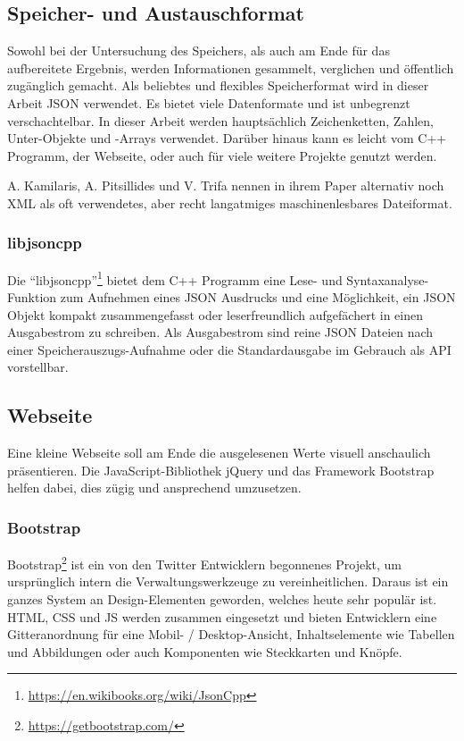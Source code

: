 \subsection{Speicher- und Austauschformat}
Sowohl bei der Untersuchung des Speichers, als auch am Ende für das aufbereitete Ergebnis, werden Informationen gesammelt, verglichen und öffentlich zugänglich gemacht.
Als beliebtes und flexibles Speicherformat wird in dieser Arbeit \ac{JSON} verwendet.
Es bietet viele Datenformate und ist unbegrenzt verschachtelbar.
In dieser Arbeit werden hauptsächlich Zeichenketten, Zahlen, Unter-Objekte und -Arrays verwendet.
Darüber hinaus kann es leicht vom C++ Programm, der Webseite, oder auch für viele weitere Projekte genutzt werden.

A. Kamilaris, A. Pitsillides und V. Trifa nennen in ihrem Paper \cite{Kamilaris2011} alternativ noch \ac{XML} als oft verwendetes, aber recht langatmiges maschinenlesbares Dateiformat.

\subsubsection{libjsoncpp}
Die "`libjsoncpp"'\footnote{\url{https://en.wikibooks.org/wiki/JsonCpp}} bietet dem C++ Programm eine Lese- und Syntaxanalyse-Funktion zum Aufnehmen eines \ac{JSON} Ausdrucks und eine Möglichkeit, ein \ac{JSON} Objekt kompakt zusammengefasst oder leserfreundlich aufgefächert in einen Ausgabestrom zu schreiben.
Als Ausgabestrom sind reine \ac{JSON} Dateien nach einer Speicherauszugs-Aufnahme oder die Standardausgabe im Gebrauch als API vorstellbar.


\subsection{Webseite}
Eine kleine Webseite soll am Ende die ausgelesenen Werte visuell anschaulich präsentieren.
Die JavaScript-Bibliothek jQuery und das Framework Bootstrap helfen dabei, dies zügig und ansprechend umzusetzen.

\subsubsection{Bootstrap}
Bootstrap\footnote{\url{https://getbootstrap.com/}} ist ein von den Twitter Entwicklern begonnenes Projekt, um ursprünglich intern die Verwaltungswerkzeuge zu vereinheitlichen.
Daraus ist ein ganzes System an Design-Elementen geworden, welches heute sehr populär ist.
\ac{HTML}, \ac{CSS} und \ac{JS} werden zusammen eingesetzt und bieten Entwicklern eine Gitteranordnung für eine Mobil- / Desktop-Ansicht, Inhaltselemente wie Tabellen und Abbildungen oder auch Komponenten wie Steckkarten und Knöpfe.

